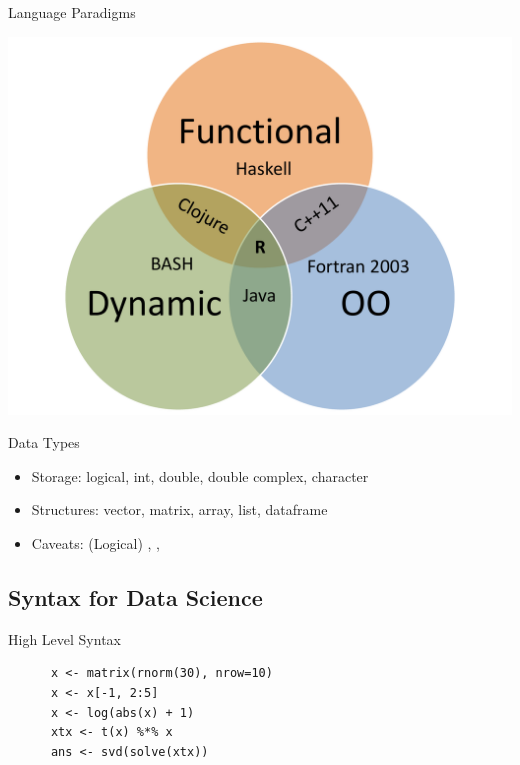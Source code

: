 \begin{frame}
  \begin{block}{Language Paradigms}\pause
    \begin{center}
      \includegraphics[scale=.35]{../common/pics/languages}
    \end{center}
  \end{block}
\end{frame}

\begin{frame}
  \begin{block}{Data Types}\pause
    \begin{itemize}[<+-|alert@+>]
    \item Storage:  logical, int, double, double complex, character
    \item Structures:  vector, matrix, array, list, dataframe
    \item Caveats:  (Logical) , , 
    \end{itemize}
  \end{block}
\end{frame}


\subsection{Syntax for Data Science}

\begin{frame}[fragile]
  \begin{block}{High Level Syntax}\pause
    \begin{lstlisting}
      x <- matrix(rnorm(30), nrow=10)
      x <- x[-1, 2:5]
      x <- log(abs(x) + 1)
      xtx <- t(x) %*% x
      ans <- svd(solve(xtx))
    \end{lstlisting}
  \end{block}
\end{frame}

